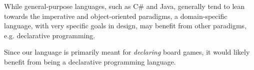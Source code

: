 While general-purpose languages, such as C\# and Java, generally tend to lean towards the imperative and object-oriented paradigms, a domain-specific language, with very specific goals in design, may benefit from other paradigms, e.g. declarative programming.

Since our language is primarily meant for {\em declaring} board games, it would likely benefit from being a declarative programming language.

